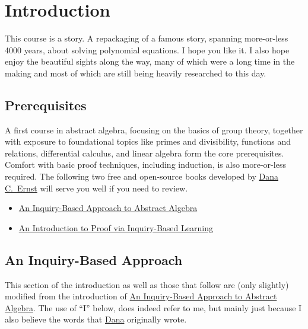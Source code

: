 \chapter{Introduction}

This course is a story. A repackaging of a famous story, spanning more-or-less 4000 years, about solving polynomial equations. I hope you like it. I also hope enjoy the beautiful sights along the way, many of which were a long time in the making and most of which are still being heavily researched to this day.

\section{Prerequisites}
A first course in abstract algebra, focusing on the basics of group theory, together with exposure to foundational topics like primes and divisibility, functions and relations, differential calculus, and linear algebra form the core prerequisites. Comfort with basic proof techniques, including induction, is also more-or-less required. The following two free and open-source books developed by \href{https://danaernst.com}{Dana C.~Ernst} will serve you well if you need to review.
\begin{itemize}
\item \href{https://github.com/dcernst/IBL-AbstractAlgebra/blob/master/Spring2018/IBL-AbstractAlgebra.pdf}{An Inquiry-Based Approach to Abstract Algebra}
\item \href{https://github.com/dcernst/IBL-IntroToProof/blob/master/IntroToProof.pdf}{An Introduction to Proof via Inquiry-Based Learning}
\end{itemize}

\section{An Inquiry-Based Approach}
This section of the introduction as well as those that follow are (only slightly) modified from the introduction of  \href{https://github.com/dcernst/IBL-AbstractAlgebra/blob/master/Spring2018/IBL-AbstractAlgebra.pdf}{An Inquiry-Based Approach to Abstract Algebra}. The use of ``I'' below, does indeed refer to me, but mainly just because I also believe the words that \href{https://danaernst.com}{Dana} originally wrote.

